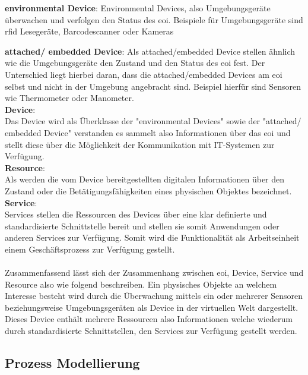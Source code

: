\documentclass[a4paper, 12pt, twoside, headsepline=true]{scrartcl} %
\begin{document}
\textbf{environmental Device}: 
Environmental Devices, also Umgebungsgeräte überwachen und verfolgen den Status des \ac{eoi}. Beispiele für Umgebungsgeräte sind \ac{rfid} Lesegeräte, Barcodescanner oder Kameras

\textbf{attached/ embedded Device}: 
Als attached/embedded Device stellen ähnlich wie die Umgebungsgeräte den Zustand und den Status des \ac{eoi} fest. Der Unterschied liegt hierbei daran, dass die attached/embedded Devices am \ac{eoi} selbst und nicht in der Umgebung angebracht sind. Beispiel hierfür sind Sensoren wie Thermometer oder Manometer.
\\

\textbf{Device}: \\
Das Device wird als Überklasse der "environmental Devices" sowie der "attached/ embedded Device" verstanden es sammelt also Informationen über das \ac{eoi} und stellt diese über die Möglichkeit der Kommunikation mit IT-Systemen zur Verfügung.
\\

\textbf{Resource}: \\
Als werden die vom Device bereitgestellten digitalen Informationen über den Zustand oder die Betätigungsfähigkeiten eines physischen Objektes bezeichnet.
\\

\textbf{Service}: \\
Services stellen die Ressourcen des Devices über eine klar definierte und standardisierte Schnittstelle bereit und stellen sie somit Anwendungen oder anderen Services zur Verfügung. Somit wird die Funktionalität als Arbeitseinheit einem Geschäftsprozess zur Verfügung gestellt.
\\
\\
Zusammenfassend lässt sich der Zusammenhang zwischen \ac{eoi}, Device, Service und Resource also wie folgend beschreiben. Ein physisches Objekte an welchem Interesse besteht wird durch die Überwachung mittels ein oder mehrerer Sensoren beziehungsweise Umgebungsgeräten als Device in der virtuellen Welt dargestellt. Dieses Device enthält mehrere Ressourcen also Informationen welche wiederum durch standardisierte Schnittstellen, den Services zur Verfügung gestellt werden.

\subsection{Prozess Modellierung}
\end{document}
